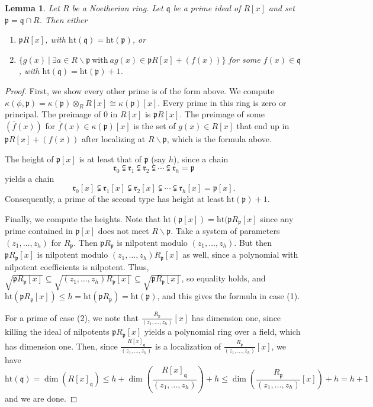 \documentclass{amsart}[12pt]
\newcommand{\htt}{\mathrm{ht}}
\newcommand{\fp}{{\mathfrak p}}
\newcommand{\fq}{{\mathfrak q}}
\newcommand{\fr}{{\mathfrak r}}
\numberwithin{equation}{section}
\theoremstyle{plain} %
\newtheorem{lem}[equation]{Lemma}
\theoremstyle{definition}
\theoremstyle{remark}
\begin{document}
\begin{lem} Let $R$ be a Noetherian ring. Let $\fq$ be a prime ideal of $R[x]$ and set $\fp=\fq \cap R$. Then either
\begin{enumerate}
\item $\fp R[x]$, with $\htt(\fq)=\htt(\fp)$, or
\item $\{ g(x) \ | \ \exists a\in R\smallsetminus \fp \ \text{with} \ a g(x) \in \fp R[x]+(f(x))\}$ for some $f(x)\in \fq$, with $\htt(\fq)=\htt(\fp)+1$.
\end{enumerate}
\end{lem}
\begin{proof}
First, we show every other prime is of the form above. We compute $\kappa(\phi,\fp) = \kappa(\fp) \otimes_R R[x] \cong  \kappa(\fp)[x]$. Every prime in this ring is zero or principal. The preimage of $0$ in $R[x]$ is $\fp R[x]$. The preimage of some $(\overline{f}(x))$ for $\overline{f}(x)\in \kappa(\fp)[x]$ is the set of $g(x)\in R[x]$ that end up in $\fp R[x]+(f(x))$ after localizing at $R\smallsetminus \fp$, which is the formula above.

The height of $\fp[x]$ is at least that of $\fp$ (say $h$), since a chain
 \[ \fr_0 \subsetneqq \fr_1 \subsetneqq \fr_2 \subsetneqq \cdots \subsetneqq \fr_h= \fp\]
 yields a chain
  \[ \fr_0[x] \subsetneqq \fr_1[x] \subsetneqq \fr_2[x] \subsetneqq \cdots \subsetneqq \fr_h[x]= \fp[x].\]
  Consequently, a prime of the second type has height at least $\htt(\fp)+1$.

Finally, we compute the heights. Note that  $\htt(\fp [x])=\htt( \fp R_{\fp}[x]$ since any prime contained in $\fp [x]$ does not meet $R\smallsetminus \fp$. Take a system of parameters $(z_1,\dots,z_h)$ for $R_{\fp}$. Then $\fp R_\fp$ is nilpotent modulo $(z_1,\dots,z_h)$. But then $\fp R_\fp[x]$ is nilpotent modulo $(z_1,\dots,z_h)R_\fp[x]$ as well, since a polynomial with nilpotent coefficients is nilpotent. Thus, $\sqrt{\fp R_\fp[x]} \subseteq \sqrt{(z_1,\dots,z_h)R_\fp[x]} \subseteq \sqrt{\fp R_\fp[x]}$, so equality holds, and $\htt(\fp R_\fp[x]) \leq h = \htt(\fp R_{\fp}) = \htt(\fp)$, and this gives the formula in case (1). 

For a prime of case (2), we note that 
$\frac{R_\fp}{(z_1,\dots,z_h)}[x]$ has dimension one, since killing the ideal of nilpotents $\fp R_\fp[x]$ yields a polynomial ring over a field, which has dimension one. Then, since $\frac{R[x]_{\fq}}{(z_1,\dots,z_h)}$ is a localization of $\frac{R_\fp}{(z_1,\dots,z_h)}[x]$, we have
\[ \htt(\fq) = \dim(R[x]_{\fq}) \leq h+ \dim\left(\frac{R[x]_{\fq}}{(z_1,\dots,z_h)}\right) + h \leq \dim \left(\frac{R_\fp}{(z_1,\dots,z_h)}[x]\right) + h = h+1\]
and we are done. \end{proof}  
\end{document}
